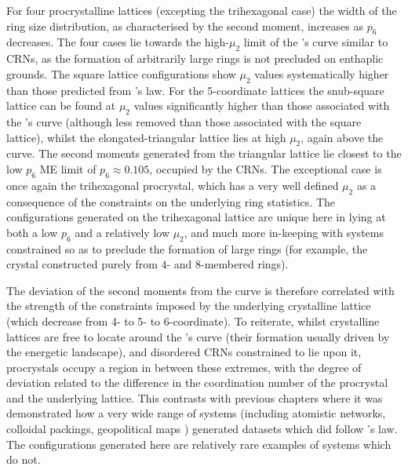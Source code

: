 For four procrystalline lattices (excepting the trihexagonal case) the width of the ring size distribution, as characterised by the second moment, increases as $p_6$ decreases. 
The four cases lie towards the high\--$\mu_2$ limit of the \lm's curve similar to CRNs, as the formation of arbitrarily large rings is not precluded on enthaplic grounds. 
The square lattice configurations show $\mu_2$ values systematically higher than those predicted from \lm's law. 
For the 5\--coordinate lattices the snub\--square lattice can be found at $\mu_2$ values significantly higher than those associated with the \lm's curve (although less removed than those
associated with the square lattice), whilst the elongated\--triangular lattice lies at high $\mu_2$, again
above the \lm{} curve. 
The second moments generated from the triangular lattice lie closest to the low $p_6$ ME limit of $p_6\approx{0.105}$, occupied by the CRNs. 
The exceptional case is once again the trihexagonal procrystal, which has a very well defined $\mu_2$ as a consequence of the constraints on the underlying ring statistics.
The configurations generated on the trihexagonal lattice are unique here in lying at both a low $p_6$ and a relatively low $\mu_2$, and much more in-keeping with systems constrained so as to preclude the formation of large rings (for example, the \td{} crystal constructed purely from $4$\-- and $8$\--membered rings).

The deviation of the second moments from the \lm{} curve is therefore correlated with the strength of the constraints imposed by the underlying crystalline lattice (which decrease from 4\-- to 5\-- to 6\--coordinate).
To reiterate, whilst crystalline lattices are free to locate around the \lm's curve (their formation usually driven by the energetic landscape), and disordered CRNs constrained to lie upon it, procrystals occupy a region in between these extremes, with the degree of deviation related to the difference in the coordination number of the procrystal and the  underlying lattice.
This contrasts with previous chapters where it was demonstrated how a very wide range of systems (including atomistic networks, colloidal packings, geopolitical maps \etc) generated datasets which did follow \lm's law.
The configurations generated here are relatively rare examples of systems which do not.


